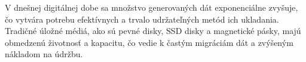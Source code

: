 V dnešnej digitálnej dobe sa množstvo generovaných dát exponenciálne zvyšuje,
čo vytvára potrebu efektívnych a trvalo udržateľných metód ich ukladania.
Tradičné úložné médiá, ako sú pevné disky, SSD disky a magnetické pásky,
majú obmedzenú životnosť a kapacitu, čo vedie k častým migráciám dát
a zvýšeným nákladom na údržbu.
